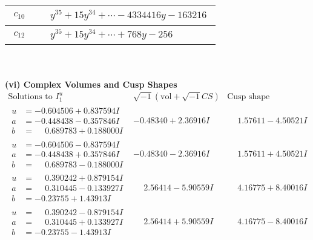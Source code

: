 \documentclass[1p]{elsarticle_modified}
\theoremstyle{definition}
\newcommand{\I}{\sqrt{-1}}
\begin{document}
\begin{tabular}{m{50pt}|m{274pt}}
\hline $$\begin{aligned}c_{10}\end{aligned}$$&$\begin{aligned}
&y^{35}+15 y^{34}+\cdots-4334416 y-163216
\end{aligned}$\\
\hline $$\begin{aligned}c_{12}\end{aligned}$$&$\begin{aligned}
&y^{35}+15 y^{34}+\cdots+768 y-256
\end{aligned}$\\
\hline
\end{tabular}\\~\\
\newpage\flushleft \textbf{(vi) Complex Volumes and Cusp Shapes}
$$\begin{array}{c|c|c}  
\text{Solutions to }I^u_{1}& \I (\text{vol} + \sqrt{-1}CS) & \text{Cusp shape}\\
 \hline 
\begin{aligned}
u &= -0.604506 + 0.837594 I \\
a &= -0.448438 - 0.357846 I \\
b &= \phantom{-}0.689783 + 0.188000 I\end{aligned}
 & -0.48340 + 2.36916 I & \phantom{-}1.57611 - 4.50521 I \\ \hline\begin{aligned}
u &= -0.604506 - 0.837594 I \\
a &= -0.448438 + 0.357846 I \\
b &= \phantom{-}0.689783 - 0.188000 I\end{aligned}
 & -0.48340 - 2.36916 I & \phantom{-}1.57611 + 4.50521 I \\ \hline\begin{aligned}
u &= \phantom{-}0.390242 + 0.879154 I \\
a &= \phantom{-}0.310445 - 0.133927 I \\
b &= -0.23755 + 1.43913 I\end{aligned}
 & \phantom{-}2.56414 - 5.90559 I & \phantom{-}4.16775 + 8.40016 I \\ \hline\begin{aligned}
u &= \phantom{-}0.390242 - 0.879154 I \\
a &= \phantom{-}0.310445 + 0.133927 I \\
b &= -0.23755 - 1.43913 I\end{aligned}
 & \phantom{-}2.56414 + 5.90559 I & \phantom{-}4.16775 - 8.40016 I \\ \hline\begin{aligned}

\end{aligned}
\end{array}$$
\end{document}
